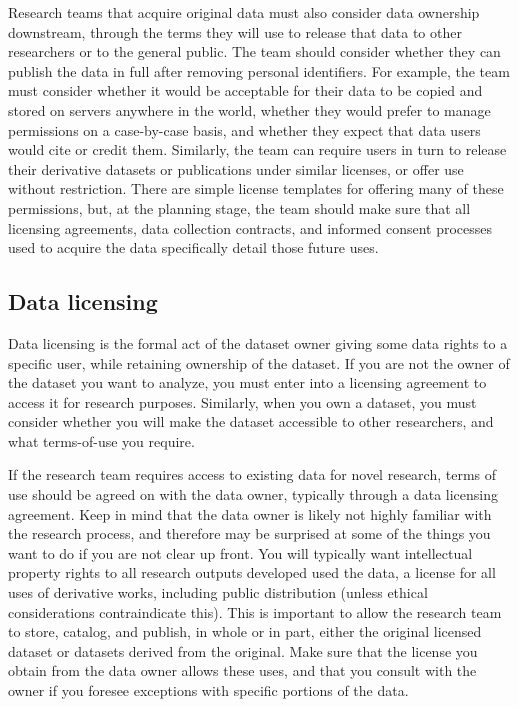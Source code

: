 Research teams that acquire original data must also consider data ownership downstream,
through the terms they will use to release that data to other researchers or to the general public.
The team should consider whether they can publish the data in full after removing personal identifiers.
For example, the team must consider whether it would be acceptable for
their data to be copied and stored on servers anywhere in the world,
whether they would prefer to manage permissions on a case-by-case basis,
and whether they expect that data users would cite or credit them.
Similarly, the team can require users in turn to release
their derivative datasets or publications under similar licenses,
or offer use without restriction.
There are simple license templates for offering many of these permissions,
but, at the planning stage, the team should make sure
that all licensing agreements, data collection contracts,
and informed consent processes
used to acquire the data specifically detail those future uses.

\subsection{Data licensing}

Data licensing
is the formal act of the dataset owner
giving some data rights to a specific user,
while retaining ownership of the dataset.
If you are not the owner of the dataset you want to analyze,
you must enter into a licensing agreement to access it for research purposes.
Similarly, when you own a dataset,
you must consider whether you will make the dataset accessible to other researchers,
and what terms-of-use you require.

If the research team requires access to existing data for novel research,
terms of use should be agreed on with the data owner,
typically through a data licensing agreement.
Keep in mind that the data owner is likely not highly familiar
with the research process, and therefore may be surprised
at some of the things you want to do if you are not clear up front.
You will typically want intellectual property rights to all research outputs developed used the data,
a license for all uses of derivative works, including public distribution
(unless ethical considerations contraindicate this).
This is important to allow the research team to store, catalog, and publish, in whole or in part,
either the original licensed dataset or datasets derived from the original.
Make sure that the license you obtain from the data owner allows these uses,
and that you consult with the owner
if you foresee exceptions with specific portions of the data.

